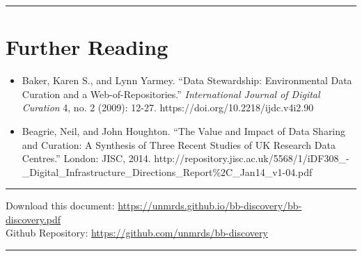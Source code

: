 \documentclass[letterpaper,twoside,11pt]{scrartcl}
\providecommand{\tightlist}{%
  \setlength{\itemsep}{0pt}\setlength{\parskip}{0pt}}
\begin{document}
\begin{multicols}{2}
\begin{center}\rule{0.5\linewidth}{\linethickness}\end{center}

\section{Further Reading}\label{further-reading}

\begin{itemize}
\tightlist
\item
  Baker, Karen S., and Lynn Yarmey. ``Data Stewardship: Environmental
  Data Curation and a Web-of-Repositories.'' \emph{International Journal
  of Digital Curation} 4, no. 2 (2009): 12-27.
  https://doi.org/10.2218/ijdc.v4i2.90
\item
  Beagrie, Neil, and John Houghton. ``The Value and Impact of Data
  Sharing and Curation: A Synthesis of Three Recent Studies of UK
  Research Data Centres.'' London: JISC, 2014.
  http://repository.jisc.ac.uk/5568/1/iDF308\_-\_Digital\_Infrastructure\_Directions\_Report\%2C\_Jan14\_v1-04.pdf
\end{itemize}

\begin{center}\rule{0.5\linewidth}{\linethickness}\end{center}

Download this document:
\href{https://unmrds.github.io/bb-security/bb-discovery.pdf}{https://unmrds.github.io/bb-discovery/bb-discovery.pdf}\\
Github Repository: \url{https://github.com/unmrds/bb-discovery}

\begin{center}\rule{0.5\linewidth}{\linethickness}\end{center}




\end{multicols}
\end{document}
